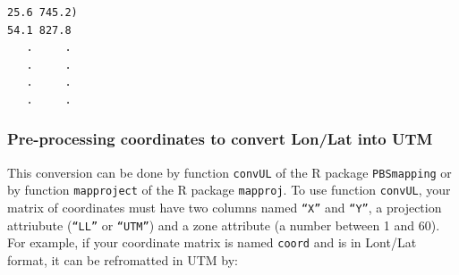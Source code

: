 \documentclass{article}
\begin{document}
\medskip
\begin{verbatim}
25.6 745.2)
54.1 827.8
   .     .
   .     .
   .     .
   .     .
\end{verbatim}










\subsubsection{Pre-processing coordinates to convert Lon/Lat into UTM} 

This conversion can be done by function {\tt convUL} of the R package {\tt PBSmapping} or by function {\tt mapproject}  
of the R package {\tt mapproj}.
To use function {\tt convUL}, your matrix of coordinates must have two columns named  {\tt ``X''} and  
{\tt ``Y''}, a projection attriubute ({\tt ``LL''} or {\tt ``UTM''}) and a zone attribute (a number between 1 and 60). 
For example, if your coordinate matrix is named {\tt coord} and is in Lont/Lat format, it can be refromatted in UTM by:
\end{document}
